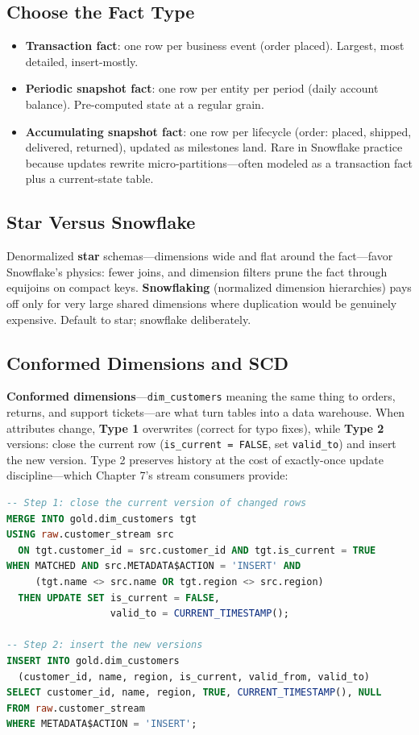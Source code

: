 \subsection{Choose the Fact Type}
\begin{itemize}
    \item \textbf{Transaction fact}: one row per business event (order placed). Largest, most detailed, insert-mostly.
    \item \textbf{Periodic snapshot fact}: one row per entity per period (daily account balance). Pre-computed state at a regular grain.
    \item \textbf{Accumulating snapshot fact}: one row per lifecycle (order: placed, shipped, delivered, returned), updated as milestones land. Rare in Snowflake practice because updates rewrite micro-partitions---often modeled as a transaction fact plus a current-state table.
\end{itemize}

\subsection{Star Versus Snowflake}
Denormalized \textbf{star} schemas---dimensions wide and flat around the fact---favor Snowflake's physics: fewer joins, and dimension filters prune the fact through equijoins on compact keys. \textbf{Snowflaking} (normalized dimension hierarchies) pays off only for very large shared dimensions where duplication would be genuinely expensive. Default to star; snowflake deliberately.

\subsection{Conformed Dimensions and SCD}
\textbf{Conformed dimensions}---\texttt{dim\_customers} meaning the same thing to orders, returns, and support tickets---are what turn tables into a data warehouse. When attributes change, \textbf{Type 1} overwrites (correct for typo fixes), while \textbf{Type 2} versions: close the current row (\texttt{is\_current = FALSE}, set \texttt{valid\_to}) and insert the new version. Type 2 preserves history at the cost of exactly-once update discipline---which Chapter 7's stream consumers provide:

\begin{lstlisting}[language=SQL, caption={SCD Type 2 from a stream: close current rows, then insert new versions}]
-- Step 1: close the current version of changed rows
MERGE INTO gold.dim_customers tgt
USING raw.customer_stream src
  ON tgt.customer_id = src.customer_id AND tgt.is_current = TRUE
WHEN MATCHED AND src.METADATA$ACTION = 'INSERT' AND
     (tgt.name <> src.name OR tgt.region <> src.region)
  THEN UPDATE SET is_current = FALSE,
                  valid_to = CURRENT_TIMESTAMP();

-- Step 2: insert the new versions
INSERT INTO gold.dim_customers
  (customer_id, name, region, is_current, valid_from, valid_to)
SELECT customer_id, name, region, TRUE, CURRENT_TIMESTAMP(), NULL
FROM raw.customer_stream
WHERE METADATA$ACTION = 'INSERT';
\end{lstlisting}

